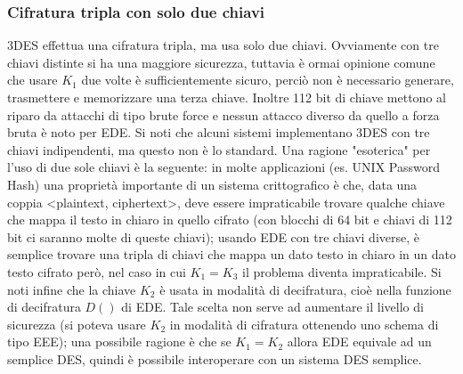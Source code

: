 \subsubsection{Cifratura tripla con solo due chiavi}
3DES effettua una cifratura tripla, ma usa solo due chiavi. Ovviamente con tre chiavi distinte si ha una maggiore sicurezza, tuttavia è ormai opinione comune che usare $K_{1}$ due volte è sufficientemente sicuro, perciò non è necessario generare, trasmettere e memorizzare una terza chiave. Inoltre 112 bit di chiave mettono al riparo da attacchi di tipo brute force e nessun attacco diverso da quello a forza bruta è noto per EDE. Si noti che alcuni sistemi implementano 3DES con tre chiavi indipendenti, ma questo non è lo standard.
\newline \newline
Una ragione "esoterica" per l'uso di due sole chiavi è la seguente: in molte applicazioni (es. UNIX Password Hash) una proprietà importante di un sistema crittografico è che, data una coppia <plaintext, ciphertext>, deve essere impraticabile trovare qualche chiave che mappa il testo in chiaro in quello cifrato (con blocchi di 64 bit e chiavi di 112 bit ci saranno molte di queste chiavi); usando EDE con tre chiavi diverse, è semplice trovare una tripla di chiavi che mappa un dato testo in chiaro in un dato testo cifrato però, nel caso in cui $K_{1} = K_{3}$ il problema diventa impraticabile.
\newline \newline
Si noti infine che la chiave $K_{2}$ è usata in modalità di decifratura, cioè nella funzione di decifratura
$D()$ di EDE. Tale scelta non serve ad aumentare il livello di sicurezza (si poteva usare $K_{2}$ in modalità di
cifratura ottenendo uno schema di tipo EEE); una possibile ragione è che se $K_{1} = K_{2}$ allora EDE
equivale ad un semplice DES, quindi è possibile interoperare con un sistema DES semplice.
